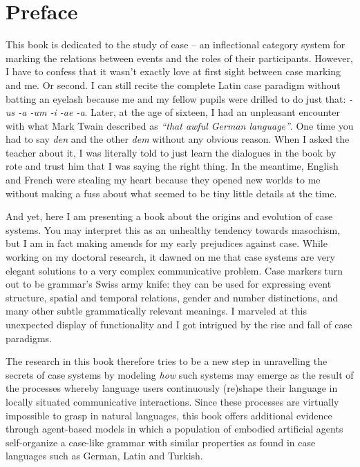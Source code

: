 \chapter*{Preface}

This book is dedicated to the study of case -- an inflectional category system for marking the relations between events and the roles of their participants. However, I have to confess that it wasn't exactly love at first sight between case marking and me. Or second. I can still recite the complete Latin case paradigm without batting an eyelash because me and my fellow pupils were drilled to do just that: \textit{ -us -a -um -i -ae -a}. Later, at the age of sixteen, I had an unpleasant encounter with what Mark Twain described as {\em ``that awful German language''}. One time you had to say {\em den} and the other {\em dem} without any obvious reason. When I asked the teacher about it, I was literally told to just learn the dialogues in the book by rote and trust him that I was saying the right thing. In the meantime, English and French were stealing my heart because they opened new worlds to me without making a fuss about what seemed to be tiny little details at the time.

And yet, here I am presenting a book about the origins and evolution of case systems. You may interpret this as an unhealthy tendency towards masochism, but I am in fact making amends for my early prejudices against case. While working on my doctoral research, it dawned on me that case systems are very elegant solutions to a very complex communicative problem. Case markers turn out to be grammar's Swiss army knife: they can be used for expressing event structure, spatial and temporal relations, gender and number distinctions, and many other subtle grammatically relevant meanings. I marveled at this unexpected display of functionality and I got intrigued by the rise and fall of case paradigms.

The research in this book therefore tries to be a new step in unravelling the secrets of case systems by modeling {\em how} such systems may emerge as the result of the processes whereby language users continuously (re)shape their language in locally situated communicative interactions. Since these processes are virtually impossible to grasp in natural languages, this book offers additional evidence through agent-based models in which a population of embodied artificial agents self-organize a case-like grammar with similar properties as found in case languages such as German, Latin and Turkish.

